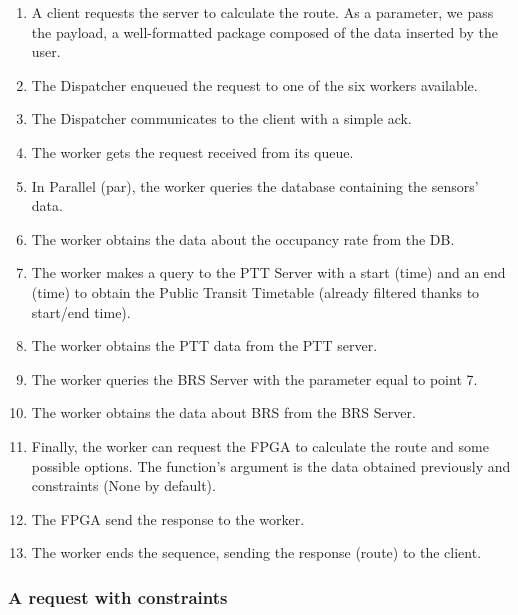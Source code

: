\documentclass[a4paper]{article}
\begin{document}
    \begin{enumerate}
        \item A client requests the server to calculate the route. As a parameter, we pass the payload, a well-formatted package composed of the data inserted by the user.
        
        \item The Dispatcher enqueued the request to one of the six workers available.

        \item The Dispatcher communicates to the client with a simple ack.
        
        \item The worker gets the request received from its queue.
        
        \item In Parallel (par), the worker queries the database containing the sensors' data.

        \item The worker obtains the data about the occupancy rate from the DB.

        \item The worker makes a query to the PTT Server with a start (time) and an end (time) to obtain the Public Transit Timetable (already filtered thanks to start/end time).

        \item The worker obtains the PTT data from the PTT server.

        \item The worker queries the BRS Server with the parameter equal to point 7.

        \item The worker obtains the data about BRS from the BRS Server.

        \item Finally, the worker can request the FPGA to calculate the route and some possible options. The function's argument is the data obtained previously and constraints (None by default).

        \item The FPGA send the response to the worker.

        \item The worker ends the sequence, sending the response (route) to the client.
    \end{enumerate}
    
    \newpage

    \subsubsection*{A request with constraints}
\end{document}

